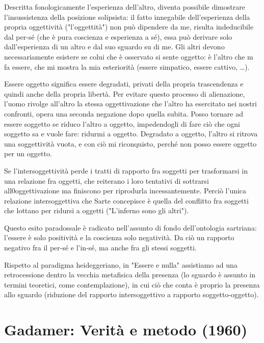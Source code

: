 Descritta fonologicamente l'esperienza dell'altro, diventa possibile dimostrare l'insussistenza della posizione solipsista: il fatto innegabile dell'esperienza della propria oggettività ("l'oggettità") non può dipendere da me, risulta indeducibile dal per-sé (che è pura coscienza e esperienza a sé), essa può derivare solo dall'esperienza di un altro e dal suo sguardo su di me. Gli altri devono necessariamente esistere se colui che è osservato si sente oggetto: è l'altro che m fa essere, che mi mostra la mia esteriorità (essere simpatico, essere cattivo, \dots).

Essere oggetto significa essere degradati, privati della propria trascendenza e quindi anche della propria libertà. Per evitare questo processo di alienazione, l'uomo  rivolge all'altro la stessa oggettivazione che l'altro ha esercitato nei nostri confronti, opera una seconda negazione dopo quella subita. Posso tornare ad essere soggetto se riduco l'altro a oggetto, impedendogli di fare ciò che ogni soggetto sa e vuole fare: ridurmi a oggetto. Degradato a oggetto, l'altro si ritrova una soggettività vuota, e con ciò mi riconquisto, perché non posso essere oggetto per un oggetto.

Se l'intersoggettività perde i tratti di rapporto fra soggetti per trasformarsi in una relazione fra oggetti, che reiterano i loro tentativi di sottrarsi all0oggettivazione ma finiscono per riprodurla incessantemente. Perciò l'unica relazione intersoggettiva che Sarte concepisce è quella del conflitto fra soggetti che lottano per ridursi a oggetti ("L’inferno sono gli altri").

Questo esito paradossale è radicato nell'assunto di fondo dell'ontologia sartriana: l'essere è solo positività e la coscienza solo negatività. Da ciò un rapporto negativo fra il per-sé e l'in-sé, ma anche fra gli stessi soggetti.

Rispetto al paradigma heideggeriano, in "Essere e nulla" assistiamo ad una retrocessione dentro la vecchia metafisica della presenza (lo sguardo è assunto in termini teoretici, come contemplazione), in cui ciò che conta è proprio la presenza allo sguardo (riduzione del rapporto intersoggettivo a rapporto soggetto-oggetto).

\section{Gadamer: Verità e metodo (1960)}


